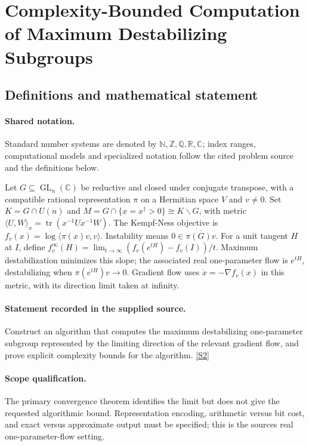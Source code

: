 \documentclass[11pt]{article}
\newcommand{\sref}[2]{\hyperlink{source:#1:#2}{[S#2]}}
\begin{document}
\section{Complexity-Bounded Computation of Maximum Destabilizing Subgroups}\label{statement}

\subsection{Definitions and mathematical statement}

\paragraph{Shared notation.}Standard number systems are denoted by $\mathbb N,\mathbb Z,\mathbb Q,\mathbb R,\mathbb C$; index ranges, computational models and specialized notation follow the cited problem source and the definitions below.


Let $G\subseteq\operatorname{GL}_n(\mathbb C)$ be reductive and closed under conjugate transpose, with a compatible rational representation $\pi$ on a Hermitian space $V$ and $v\ne0$. Set $K=G\cap U(n)$ and $M=G\cap\{x=x^\dagger>0\}\cong K\backslash G$, with metric $\langle U,W\rangle_x=\operatorname{tr}(x^{-1}Ux^{-1}W)$. The Kempf-Ness objective is $f_v(x)=\log\langle\pi(x)v,v\rangle$. Instability means $0\in\overline{\pi(G)v}$. For a unit tangent $H$ at $I$, define $f_v^\infty(H)=\lim_{t\to\infty}(f_v(e^{tH})-f_v(I))/t$. Maximum destabilization minimizes this slope; the associated real one-parameter flow is $e^{tH}$, destabilizing when $\pi(e^{tH})v\to0$. Gradient flow uses $\dot x=-\nabla f_v(x)$ in this metric, with its direction limit taken at infinity.
\paragraph{Statement recorded in the supplied source.}
Construct an algorithm that computes the maximum destabilizing one-parameter subgroup represented by the limiting direction of the relevant gradient flow, and prove explicit complexity bounds for the algorithm. \sref{statement}{2}
\paragraph{Scope qualification.}
The primary convergence theorem identifies the limit but does not give the requested algorithmic bound. Representation encoding, arithmetic versus bit cost, and exact versus approximate output must be specified; this is the source\textquotesingle s real one-parameter-flow setting.
\end{document}
